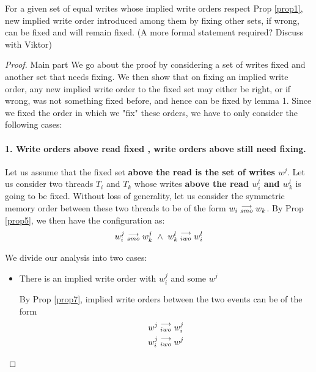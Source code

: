 
        \begin{lemma}
            For a given set of equal writes whose implied write orders respect Prop \ref{prop1}, new implied write order introduced among them by fixing other sets, if wrong, can be fixed and will remain fixed. 
            (A more formal statement required? Discuss with Viktor)        
        \end{lemma}

        \begin{proof}{Main part}
            We go about the proof by considering a set of writes fixed and another set that needs fixing. 
            We then show that on fixing an implied write order, any new implied write order to the fixed set may either be right, or if wrong, was not something fixed before, and hence can be fixed by lemma 1. 
            Since we fixed the order in which we "fix" these orders, we have to only consider the following cases:
            \paragraph{1. Write orders above read fixed , write orders above still need fixing.}

                Let us assume that the fixed set \textbf{above the read is the set of writes $w^j$}. Let us consider two threads $T_i$ and $T_k$ whose writes \textbf{above the read $w_i^l$ and $w_k^l$} is going to be fixed. Without loss of generality, let us consider the symmetric memory order between these two threads to be of the form $w_i\stackrel{\longrightarrow}{_{smo}}w_k$.  By Prop \ref{prop5}, we then have the configuration as:
                \begin{align*}
                    \reln{w_i^j}{smo}{w_k^j} \ \wedge \ \reln{w_k^l}{iwo}{w_i^l}
                \end{align*}

                We divide our analysis into two cases: 
                
                \begin{itemize}
                    \item There is an implied write order with $w_i^j$ and some $w^j$

                        By Prop \ref{prop7}, implied write orders between the two events can be of the form 
                        \begin{align*}
                            w^j\stackrel{\longrightarrow}{_{iwo}}w_i^j \\
                            w_i^j\stackrel{\longrightarrow}{_{iwo}}w^j
                        \end{align*}


\end{itemize}
\end{proof}
